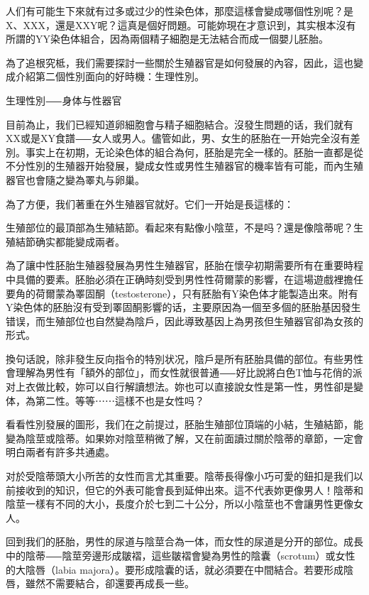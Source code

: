 \documentclass[12pt,UTF8]{ctexbook}
\begin{document}
人们有可能生下來就有过多或过少的性染色体，那麼這樣會變成哪個性別呢？是X、XXX，還是XXY呢？這真是個好問題。可能妳現在才意识到，其实根本沒有所謂的YY染色体組合，因為兩個精子細胞是无法結合而成一個嬰儿胚胎。

為了追根究柢，我们需要探討一些關於生殖器官是如何發展的內容，因此，這也變成介紹第二個性別面向的好時機：生理性別。





生理性別⸺身体与性器官




目前為止，我们已經知道卵細胞會与精子細胞結合。沒發生問題的话，我们就有XX或是XY食譜⸺女人或男人。儘管如此，男、女生的胚胎在一开始完全沒有差別。事实上在初期，无论染色体的組合為何，胚胎是完全一樣的。胚胎一直都是從不分性別的生殖器开始發展，變成女性或男性生殖器官的機率皆有可能，而內生殖器官也會隨之變為睪丸与卵巢。

為了方便，我们著重在外生殖器官就好。它们一开始是長這樣的：





生殖部位的最頂部為生殖結節。看起來有點像小陰莖，不是吗？還是像陰蒂呢？生殖結節确实都能變成兩者。

為了讓中性胚胎生殖器發展為男性生殖器官，胚胎在懷孕初期需要所有在重要時程中具備的要素。胚胎必須在正确時刻受到男性性荷爾蒙的影響，在這場遊戲裡擔任要角的荷爾蒙為睪固酮（testosterone），只有胚胎有Y染色体才能製造出來。附有Y染色体的胚胎沒有受到睪固酮影響的话，主要原因為一個至多個的胚胎基因發生错误，而生殖部位也自然變為陰戶，因此導致基因上為男孩但生殖器官卻為女孩的形式。

換句话說，除非發生反向指令的特別状况，陰戶是所有胚胎具備的部位。有些男性會理解為男性有「額外的部位」，而女性就很普通⸺好比說將白色T恤与花俏的派对上衣做比較，妳可以自行解讀想法。妳也可以直接說女性是第一性，男性卻是變体，為第二性。等等⋯⋯這樣不也是女性吗？

看看性別發展的圖形，我们在之前提过，胚胎生殖部位頂端的小結，生殖結節，能變為陰莖或陰蒂。如果妳对陰莖稍微了解，又在前面讀过關於陰蒂的章節，一定會明白兩者有許多共通處。

对於受陰蒂頭大小所苦的女性而言尤其重要。陰蒂長得像小巧可愛的鈕扣是我们以前接收到的知识，但它的外表可能會長到延伸出來。這不代表妳更像男人！陰蒂和陰莖一樣有不同的大小，長度介於七到二十公分，所以小陰莖也不會讓男性更像女人。

回到我们的胚胎，男性的尿道与陰莖合為一体，而女性的尿道是分开的部位。成長中的陰蒂⸺陰莖旁邊形成皺褶，這些皺褶會變為男性的陰囊（scrotum）或女性的大陰唇（labia majora）。要形成陰囊的话，就必須要在中間結合。若要形成陰唇，雖然不需要結合，卻還要再成長一些。
\end{document}
